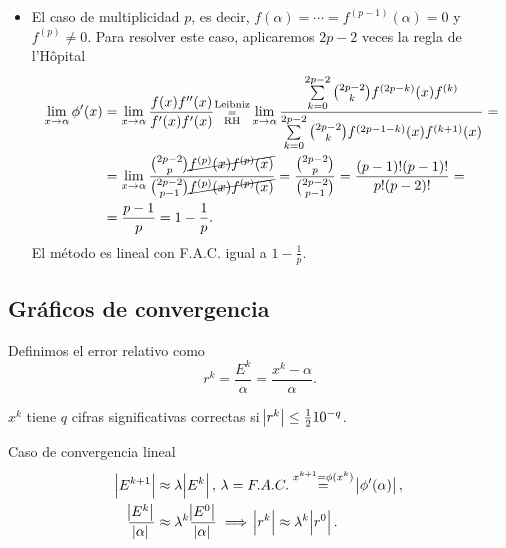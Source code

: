 \begin{itemize}
    \item El caso de multiplicidad $p$, es decir, $f(\alpha) = \cdots = f^{(p-1)}(\alpha) = 0$ y
        $f^{(p)} \neq 0$. Para resolver este caso, aplicaremos $2p-2$ veces la regla de l'Hôpital
        \[
            \begin{aligned}
                \lim_{x \to \alpha} \phi^\prime(x) &= \lim_{x \to \alpha} \frac{f(x)f^{\prime \prime}(x)}{f^\prime(x) f^\prime(x)}
                \substack{\text{Leibniz}\\=\\\text{RH}} \lim_{x \to \alpha} \frac{\sum\limits^{2p-2}_{k = 0} {2p-2 \choose k}
                f^{(2p-k)}(x)f^{(k)}}{\sum\limits^{2p-2}_{k = 0} {2p-2 \choose k }f^{(2p-1-k)}(x)f^{(k+1)}(x)} = \\
                &= \lim_{x \to \alpha} \frac{{2p-2 \choose p} \cancel{f^{(p)}(x)f^{(p)}(x)}}
                {{2p-2 \choose p-1}\cancel{f^{(p)}(x)f^{(p)}(x)}} =
                \frac{ {2p-2 \choose p} }{ {2p-2 \choose p-1} } = \frac{(p-1)!(p-1)!}{p!(p-2)!} = \\
                &= \frac{p-1}{p} = 1 - \frac{1}{p}.
            \end{aligned}
        \]
        El método es lineal con F.A.C. igual a $1 - \frac{1}{p}$.
\end{itemize}

\subsection{Gráficos de convergencia}

\begin{defi}
    Definimos el error relativo como
    \[
        r^k = \frac{E^k}{\alpha} = \frac{x^k - \alpha}{\alpha}.
    \]
\end{defi}
\begin{obs}
    $x^k$ tiene $q$ cifras significativas correctas si $\abs{r^k} \leq \frac{1}{2} 10^{-q}$.
\end{obs}
\noindent Caso de convergencia lineal
\begin{align*}
    \abs{E^{k+1}} &\approx \lambda \abs{E^k},\, \lambda = F.A.C. \stackrel{x^{k+1} = \phi(x^k)}{=} \abs{\phi'(\alpha)}, \\
    \frac{\abs{E^k}}{\abs{\alpha}} &\approx \lambda^k\frac{\abs{E^0}}{\abs{\alpha}} \implies \abs{r^k} \approx \lambda^k\abs{r^0}.
\end{align*}

